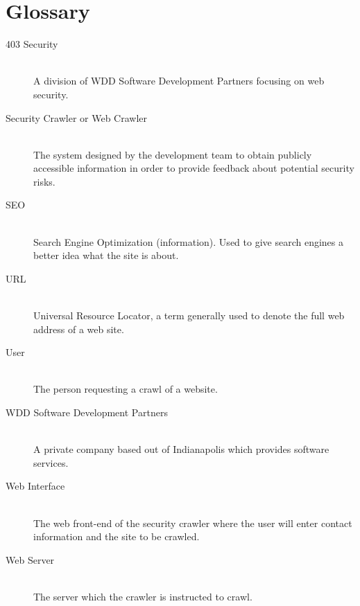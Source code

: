 \section{Glossary}
\begin{description}
    \item[403 Security] \hfill \\
        A division of WDD Software Development Partners focusing on web security.
    \item[Security Crawler or Web Crawler] \hfill \\
        The system designed by the development team to obtain publicly accessible information in order to provide feedback about potential security risks.
    \item[SEO]\hfill \\
        Search Engine Optimization (information).  Used to give search engines a better idea what the site is about.
    \item[URL]\hfill \\
Universal Resource Locator, a term generally used to denote the full web address of a web site.
\item[User]\hfill \\
The person requesting a crawl of a website.
\item[WDD Software Development Partners]\hfill \\
A private company based out of Indianapolis which provides software services.
\item[Web Interface] \hfill \\
The web front-end of the security crawler where the user will enter contact information and the site to be crawled.
\item[Web Server]\hfill \\
The server which the crawler is instructed to crawl.

\end{description}
